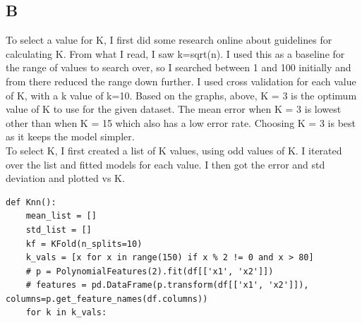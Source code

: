 \documentclass[11pt]{article} %
\begin{document}
\subsection{B}
\begin{figure}[h]
\centering
{}
\qquad
{}
\qquad
\end{figure}
To select a value for K, I first did some research online about guidelines for calculating K. From what I read, I saw k=sqrt(n). I used this as a baseline for the range of values to search over, so I searched between 1 and 100 initially and from there reduced the range down further. I used cross validation for each value of K, with a k value of k=10. Based on the graphs, above, K = 3 is the optimum value of K to use for the given dataset. The mean error when K = 3 is lowest other than when K = 15 which also has a low error rate. Choosing K = 3 is best as it keeps the model simpler.\\
To select K, I first created a list of K values, using odd values of K. I iterated over the list and fitted models for each value. I then got the error and std deviation and plotted vs K.
\begin{verbatim}
def Knn():
    mean_list = []
    std_list = []
    kf = KFold(n_splits=10)
    k_vals = [x for x in range(150) if x % 2 != 0 and x > 80]
    # p = PolynomialFeatures(2).fit(df[['x1', 'x2']])
    # features = pd.DataFrame(p.transform(df[['x1', 'x2']]), columns=p.get_feature_names(df.columns))
    for k in k_vals:
\end{verbatim}
\end{document}
